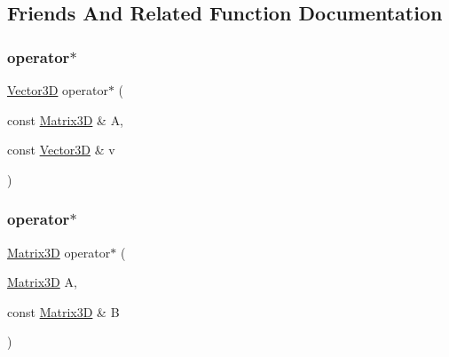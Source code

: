 \subsection{Friends And Related Function Documentation}
\mbox{\label{classlinalg_1_1Matrix3D_a7ae064396881469e4d815cfba5804a2e}} 
\subsubsection{\texorpdfstring{operator$\ast$}{operator*}\hspace{0.1cm}{\footnotesize\ttfamily [1/2]}}
{\footnotesize\ttfamily \mbox{\hyperlink{classVector3D}{Vector3D}} operator$\ast$ (\begin{DoxyParamCaption}\item[{const \mbox{\hyperlink{classlinalg_1_1Matrix3D}{Matrix3D}} \&}]{A,  }\item[{const \mbox{\hyperlink{classVector3D}{Vector3D}} \&}]{v }\end{DoxyParamCaption})\hspace{0.3cm}{\ttfamily [friend]}}

\mbox{\label{classlinalg_1_1Matrix3D_a701c3381ba551de2652b9f021a8454ec}} 
\subsubsection{\texorpdfstring{operator$\ast$}{operator*}\hspace{0.1cm}{\footnotesize\ttfamily [2/2]}}
{\footnotesize\ttfamily \mbox{\hyperlink{classlinalg_1_1Matrix3D}{Matrix3D}} operator$\ast$ (\begin{DoxyParamCaption}\item[{\mbox{\hyperlink{classlinalg_1_1Matrix3D}{Matrix3D}}}]{A,  }\item[{const \mbox{\hyperlink{classlinalg_1_1Matrix3D}{Matrix3D}} \&}]{B }\end{DoxyParamCaption})\hspace{0.3cm}{\ttfamily [friend]}}

\mbox{\label{classlinalg_1_1Matrix3D_a54929d88410f4beedd5ef7ef3ba8cffc}} 
